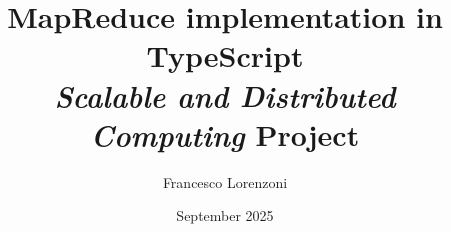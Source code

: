 


\lstset{language=JavaScript}



\lstset{
  language=JavaScript
}

\let\oldverb\verb

\makeatletter
\def\verb{\@ifnextchar|{\verb@colored}{\oldverb}}
\def\verb@colored|#1|{\colorbox{mybg}{\footnotesize\ttfamily\color{mytext}\detokenize{#1}}}
\makeatother

\title{MapReduce implementation in TypeScript \\{\large \textit{Scalable and Distributed Computing} Project}}
\author{Francesco Lorenzoni}
\date{September 2025}



\maketitle
\tableofcontents



